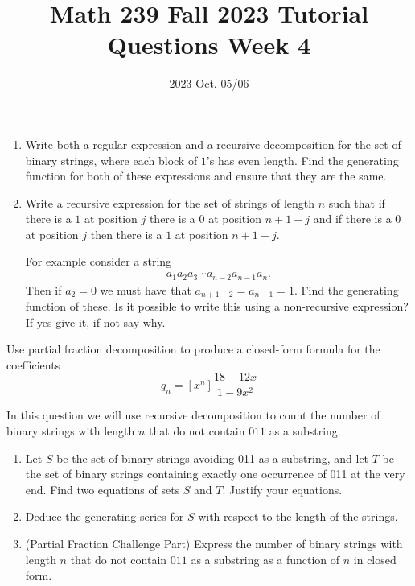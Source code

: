 \title{Math 239 Fall 2023 Tutorial Questions Week 4}

\date{2023 Oct. 05/06}
\maketitle

\begin{enumerate}
    \begin{enumerate}
        \item Write both a regular expression and a recursive decomposition for the set of binary strings, where each block of $1$'s has even length. Find the generating function for both of these expressions and ensure that they are the same.
        \item Write a recursive expression for the set of strings of length $n$ such that if there is a $1$ at position $j $ there is a $0$ at position $n+1-j$ and if there is a $0$ at position $j$ then there is a $1$ at position $n+1-j$.
        
        For example consider a string
        \begin{align*}
            a_1 a_2 a_3 \cdots a_{n-2} a_{n-1} a_n.
        \end{align*}
        Then if $a_2 = 0$ we must have that $a_{n+1-2} = a_{n-1} = 1$. Find the generating function of these.
        Is it possible to write this using a non-recursive expression? If yes give it, if not say why.
    \end{enumerate}
   
    
     Use partial fraction decomposition to produce a closed-form formula for the coefficients
    \[q_n = [x^n] \frac{18+12x}{1-9x^2}\]

    \newpage
     
        In this question we will use recursive decomposition to count the number of binary strings with length $n$ that do not contain $011$ as a substring. 
        \begin{enumerate}
             \item Let $S$ be the set of binary strings avoiding 011 as a substring, and let $T$ be the set of binary strings containing exactly one occurrence of 011 at the very end. Find two equations of sets $S$ and $T$. Justify your equations. 
             \item Deduce the generating series for $S$ with respect to the length of the strings.
             \item (Partial Fraction Challenge Part) Express the number of binary strings with length $n$ that do not contain $011$ as a substring as a function of $n$ in closed form.
        \end{enumerate}


\end{enumerate}
